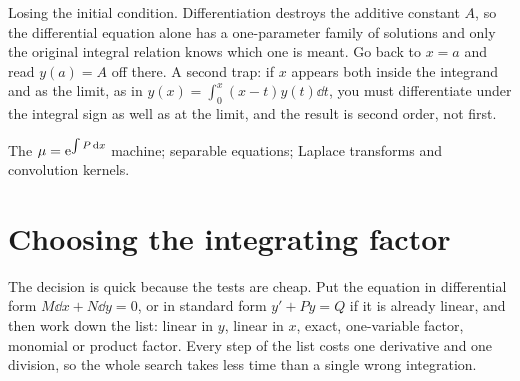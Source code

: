 \begin{trap}
Losing the initial condition. Differentiation destroys the additive constant $A$, so the differential equation alone has a one-parameter family of solutions and only the original integral relation knows which one is meant. Go back to $x=a$ and read $y(a)=A$ off there. A second trap: if $x$ appears both inside the integrand and as the limit, as in $y(x)=\int_0^{x}(x-t)y(t)\dd t$, you must differentiate under the integral sign as well as at the limit, and the result is second order, not first.
\end{trap}

\begin{seealsob}The $\mu=\mathrm{e}^{\int P\,\mathrm{d} x}$ machine; separable equations; Laplace transforms and convolution kernels.\end{seealsob}

\section{Choosing the integrating factor}

The decision is quick because the tests are cheap. Put the equation in differential form $M\dd x+N\dd y=0$, or in standard form $y'+Py=Q$ if it is already linear, and then work down the list: linear in $y$, linear in $x$, exact, one-variable factor, monomial or product factor. Every step of the list costs one derivative and one division, so the whole search takes less time than a single wrong integration.

\begin{center}
\end{center}

